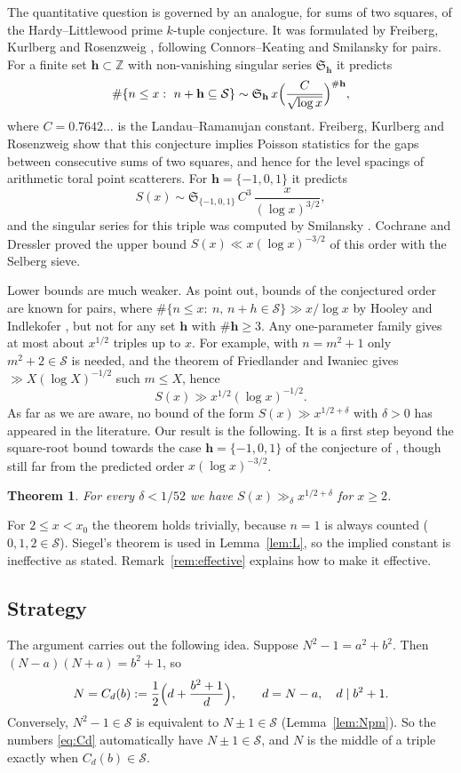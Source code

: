 \documentclass[11pt]{amsart}
\newtheorem{theorem}{Theorem}[section]
\theoremstyle{remark}
\theoremstyle{definition}
\numberwithin{equation}{section}
\newcommand{\Sc}{\mathcal{S}}
\newcommand{\Z}{\mathbb{Z}}
\begin{document}
The quantitative question is governed by an analogue, for sums of two squares, of the Hardy--Littlewood prime $k$-tuple conjecture. It was formulated by Freiberg, Kurlberg and Rosenzweig \cite[Conjecture~1.1]{FKR}, following Connors--Keating \cite{CK} and Smilansky \cite{Sm} for pairs. For a finite set $\mathbf h\subset\Z$ with non-vanishing singular series $\mathfrak S_{\mathbf h}$ it predicts
\[
\#\{n\le x:\ n+\mathbf h\subseteq\Sc\}\sim\mathfrak S_{\mathbf h}\,x\Bigl(\frac{C}{\sqrt{\log x}}\Bigr)^{\#\mathbf h},
\]
where $C=0.7642\ldots$ is the Landau--Ramanujan constant. Freiberg, Kurlberg and Rosenzweig show that this conjecture implies Poisson statistics for the gaps between consecutive sums of two squares, and hence for the level spacings of arithmetic toral point scatterers. For $\mathbf h=\{-1,0,1\}$ it predicts
\[
S(x)\sim\mathfrak S_{\{-1,0,1\}}\,C^3\,\frac{x}{(\log x)^{3/2}},
\]
and the singular series for this triple was computed by Smilansky \cite{Sm}. Cochrane and Dressler \cite{CD} proved the upper bound $S(x)\ll x(\log x)^{-3/2}$ of this order with the Selberg sieve.

Lower bounds are much weaker. As \cite{FKR} point out, bounds of the conjectured order are known for pairs, where $\#\{n\le x:\ n,\,n+h\in\Sc\}\gg x/\log x$ by Hooley \cite{Ho74} and Indlekofer \cite{In}, but not for any set $\mathbf h$ with $\#\mathbf h\ge3$. Any one-parameter family gives at most about $x^{1/2}$ triples up to $x$. For example, with $n=m^2+1$ only $m^2+2\in\Sc$ is needed, and the theorem of Friedlander and Iwaniec \cite[Theorem~2]{FI78} gives $\gg X(\log X)^{-1/2}$ such $m\le X$, hence
\[
S(x)\gg x^{1/2}(\log x)^{-1/2}.
\]
As far as we are aware, no bound of the form $S(x)\gg x^{1/2+\delta}$ with $\delta>0$ has appeared in the literature. Our result is the following. It is a first step beyond the square-root bound towards the case $\mathbf h=\{-1,0,1\}$ of the conjecture of \cite{FKR}, though still far from the predicted order $x(\log x)^{-3/2}$.

\begin{theorem}\label{thm:main}
For every $\delta<1/52$ we have $S(x)\gg_\delta x^{1/2+\delta}$ for $x\ge 2$.
\end{theorem}

For $2\le x<x_0$ the theorem holds trivially, because $n=1$ is always counted ($0,1,2\in\Sc$). Siegel's theorem is used in Lemma~\ref{lem:L}, so the implied constant is ineffective as stated. Remark~\ref{rem:effective} explains how to make it effective.

\subsection{Strategy}
The argument carries out the following idea. Suppose $N^2-1=a^2+b^2$. Then $(N-a)(N+a)=b^2+1$, so
\begin{equation}\label{eq:Cd}
N=C_d(b):=\frac12\Bigl(d+\frac{b^2+1}{d}\Bigr),\qquad d=N-a,\quad d\mid b^2+1 .
\end{equation}
Conversely, $N^2-1\in\Sc$ is equivalent to $N\pm1\in\Sc$ (Lemma~\ref{lem:Npm}). So the numbers \eqref{eq:Cd} automatically have $N\pm 1\in\Sc$, and $N$ is the middle of a triple exactly when $C_d(b)\in\Sc$.
\end{document}
